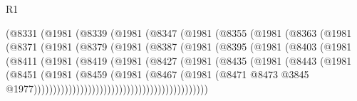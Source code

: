 \begin{lexlean}{R1}
\begin{coremodule}
                    (@8331
                      (@1981
                        (@8339
                          (@1981
                            (@8347
                              (@1981
                                (@8355
                                  (@1981
                                    (@8363
                                      (@1981
                                        (@8371
                                          (@1981
                                            (@8379
                                              (@1981
                                                (@8387
                                                  (@1981
                                                    (@8395
                                                      (@1981
                                                        (@8403
                                                          (@1981
                                                            (@8411
                                                              (@1981
                                                                (@8419
                                                                  (@1981
                                                                    (@8427
                                                                      (@1981
                                                                        (@8435
                                                                          (@1981
                                                                            (@8443
                                                                              (@1981
                                                                                (@8451
                                                                                  (@1981
                                                                                    (@8459
                                                                                      (@1981
                                                                                        (@8467
                                                                                          (@1981
                                                                                            (@8471
                                                                                              @8473
                                                                                              @3845
                                                                                              @1977)))))))))))))))))))))))))))))))))))))))))))))

\end{coremodule}
\end{lexlean}
